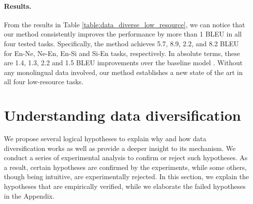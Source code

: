 \documentclass{article}
\begin{document}
\vspace{-0.5em}
\paragraph{Results.} From the results in Table \ref{table:data_diverse_low_resource}, we can notice that our method consistently improves the performance by more than 1 BLEU in all four tested tasks. Specifically, the method achieves 5.7, 8.9, 2.2, and 8.2 BLEU for En-Ne, Ne-En, En-Si and Si-En tasks, respectively. In absolute terms, these are 1.4, 1.3, 2.2 and 1.5 BLEU improvements over the baseline model \citep{flores}. Without any monolingual data involved, our method establishes a new state of the art in all four low-resource tasks.





\section{Understanding data diversification}
\label{sec:analysis}

We propose several logical hypotheses to explain why and how data diversification works as well as provide a deeper insight to its mechanism. We conduct a series of experimental analysis to confirm or reject such hypotheses. As a result, certain hypotheses are confirmed by the experiments, while some others, though being intuitive, are experimentally rejected. In this section, we explain the hypotheses that are empirically verified, while we elaborate the failed hypotheses in the Appendix.
\end{document}
